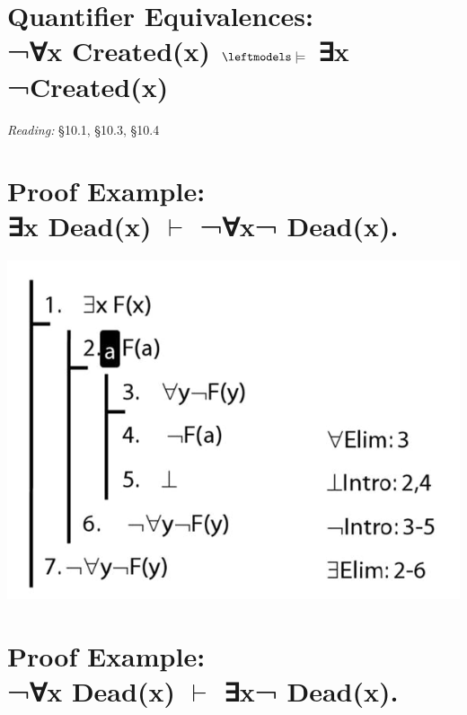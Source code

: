\documentclass[12pt]{extarticle}
\begin{document}
\begin{multicols*}{3}
 
\section{Quantifier Equivalences: \\ ¬∀x Created(x) $\leftmodels\models$ ∃x ¬Created(x)}
 
\emph{Reading:} §10.1, §10.3, §10.4
 
 
 
\section{Proof Example: \\ ∃x Dead(x) $\vdash$ ¬∀x¬ Dead(x).}
 
\begin{center}
\includegraphics[scale=0.3]{img/unit_825_proof.png}
\end{center}
 
 
\section{Proof Example: \\ ¬∀x Dead(x) $\vdash$ ∃x¬ Dead(x).}
 

\end{multicols*}
\end{document}
